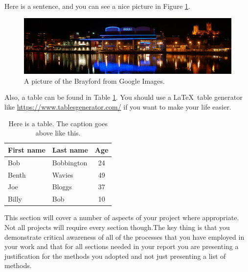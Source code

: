 Here is a sentence, and you can see a nice picture in Figure \ref{fig:brayford}.

\begin{figure}[h]
    \centering
    \includegraphics[width=\textwidth]{figures/brayford.jpg}
    \caption{A picture of the Brayford from Google Images.}
    \label{fig:brayford}
\end{figure}

Also, a table can be found in Table \ref{tbl:example-table}. You should use a \LaTeX~table generator like \url{https://www.tablesgenerator.com/} if you want to make your life easier.

\begin{table}[h]
    \caption{Here is a table. The caption goes above like this.}
    \centering
    \begin{tabular}{l|l|c}
        First name & Last name & Age \\
        \hline\hline
        Bob & Bobbington & 24 \\
        Benth & Wavies & 49 \\
        Joe & Bloggs & 37 \\
        Billy & Bob & 10 \\

    \end{tabular}
    \label{tbl:example-table}
\end{table}

This section will cover a number of aspects of your project where appropriate. Not all projects will require every section though.The key thing is that you demonstrate critical awareness of all of the processes that you have employed in your work and that for all sections needed in your report you are presenting a justification for the methods you adopted and not just presenting a list of methods.


